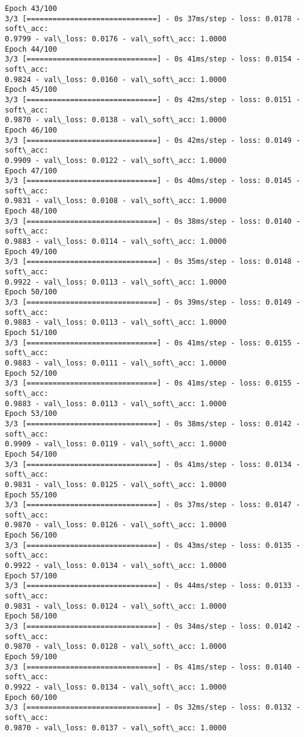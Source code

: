 \documentclass[11pt]{article}
\begin{document}
\begin{Verbatim}[commandchars=\\\{\}]
Epoch 43/100
3/3 [==============================] - 0s 37ms/step - loss: 0.0178 - soft\_acc:
0.9799 - val\_loss: 0.0176 - val\_soft\_acc: 1.0000
Epoch 44/100
3/3 [==============================] - 0s 41ms/step - loss: 0.0154 - soft\_acc:
0.9824 - val\_loss: 0.0160 - val\_soft\_acc: 1.0000
Epoch 45/100
3/3 [==============================] - 0s 42ms/step - loss: 0.0151 - soft\_acc:
0.9870 - val\_loss: 0.0138 - val\_soft\_acc: 1.0000
Epoch 46/100
3/3 [==============================] - 0s 42ms/step - loss: 0.0149 - soft\_acc:
0.9909 - val\_loss: 0.0122 - val\_soft\_acc: 1.0000
Epoch 47/100
3/3 [==============================] - 0s 40ms/step - loss: 0.0145 - soft\_acc:
0.9831 - val\_loss: 0.0108 - val\_soft\_acc: 1.0000
Epoch 48/100
3/3 [==============================] - 0s 38ms/step - loss: 0.0140 - soft\_acc:
0.9883 - val\_loss: 0.0114 - val\_soft\_acc: 1.0000
Epoch 49/100
3/3 [==============================] - 0s 35ms/step - loss: 0.0148 - soft\_acc:
0.9922 - val\_loss: 0.0113 - val\_soft\_acc: 1.0000
Epoch 50/100
3/3 [==============================] - 0s 39ms/step - loss: 0.0149 - soft\_acc:
0.9883 - val\_loss: 0.0113 - val\_soft\_acc: 1.0000
Epoch 51/100
3/3 [==============================] - 0s 41ms/step - loss: 0.0155 - soft\_acc:
0.9883 - val\_loss: 0.0111 - val\_soft\_acc: 1.0000
Epoch 52/100
3/3 [==============================] - 0s 41ms/step - loss: 0.0155 - soft\_acc:
0.9883 - val\_loss: 0.0113 - val\_soft\_acc: 1.0000
Epoch 53/100
3/3 [==============================] - 0s 38ms/step - loss: 0.0142 - soft\_acc:
0.9909 - val\_loss: 0.0119 - val\_soft\_acc: 1.0000
Epoch 54/100
3/3 [==============================] - 0s 41ms/step - loss: 0.0134 - soft\_acc:
0.9831 - val\_loss: 0.0125 - val\_soft\_acc: 1.0000
Epoch 55/100
3/3 [==============================] - 0s 37ms/step - loss: 0.0147 - soft\_acc:
0.9870 - val\_loss: 0.0126 - val\_soft\_acc: 1.0000
Epoch 56/100
3/3 [==============================] - 0s 43ms/step - loss: 0.0135 - soft\_acc:
0.9922 - val\_loss: 0.0134 - val\_soft\_acc: 1.0000
Epoch 57/100
3/3 [==============================] - 0s 44ms/step - loss: 0.0133 - soft\_acc:
0.9831 - val\_loss: 0.0124 - val\_soft\_acc: 1.0000
Epoch 58/100
3/3 [==============================] - 0s 34ms/step - loss: 0.0142 - soft\_acc:
0.9870 - val\_loss: 0.0128 - val\_soft\_acc: 1.0000
Epoch 59/100
3/3 [==============================] - 0s 41ms/step - loss: 0.0140 - soft\_acc:
0.9922 - val\_loss: 0.0134 - val\_soft\_acc: 1.0000
Epoch 60/100
3/3 [==============================] - 0s 32ms/step - loss: 0.0132 - soft\_acc:
0.9870 - val\_loss: 0.0137 - val\_soft\_acc: 1.0000

\end{Verbatim}
\end{document}
